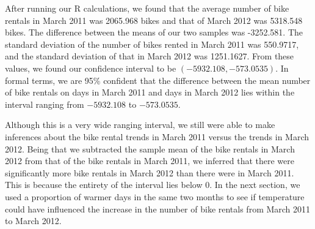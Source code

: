 \documentclass[11pt]{article}
\begin{document}
After running our R calculations, we found that the average number of bike rentals in March 2011 was 2065.968 bikes and that of March 2012 was 5318.548 bikes. The difference between the means of our two samples was -3252.581. The standard deviation of the number of bikes rented in March 2011 was 550.9717, and the standard deviation of that in March 2012 was 1251.1627. From these values, we found our confidence interval to be $(-5932.108, -573.0535)$. In formal terms, we are 95\% confident that the difference between the mean number of bike rentals on days in March 2011 and days in March 2012 lies within the interval ranging from $-5932.108$ to $-573.0535$.  

Although this is a very wide ranging interval, we still were able to make inferences about the bike rental trends in March 2011 versus the trends in March 2012. Being that we subtracted the sample mean of the bike rentals in March 2012 from that of the bike rentals in March 2011, we inferred that there were significantly more bike rentals in March 2012 than there were in March 2011. This is because the entirety of the interval lies below 0. In the next section, we used a proportion of warmer days in the same two months to see if temperature could have influenced the increase in the number of bike rentals from March 2011 to March 2012.
\end{document}
